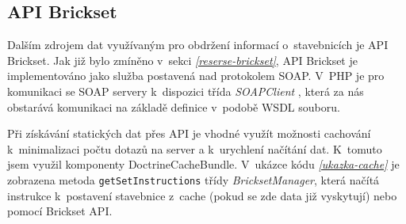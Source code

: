 
\subsection{API Brickset}
Dalším zdrojem dat využívaným pro obdržení informací o~stavebnicích je API Brickset. Jak již bylo zmíněno v~sekci \emph{\ref{reserse-brickset}}, API Brickset je implementováno jako služba postavená nad protokolem \gls{SOAP}. V~PHP je pro komunikaci se SOAP servery k~dispozici třída \textit{SOAPClient} \autocite{soapclient}, která za nás obstarává komunikaci na základě definice v~podobě \gls{WSDL} souboru. 

Při získávání statických dat přes API je vhodné využít možnosti cachování k~minimalizaci počtu dotazů na server a k~urychlení načítání dat. K~tomuto jsem využil komponenty DoctrineCacheBundle. V~ukázce kódu \emph{\ref{ukazka-cache}} je zobrazena metoda \texttt{getSetInstructions} třídy \textit{BricksetManager}, která načítá instrukce k~postavení stavebnice z~cache (pokud se zde data již vyskytují) nebo pomocí Brickset API. 


